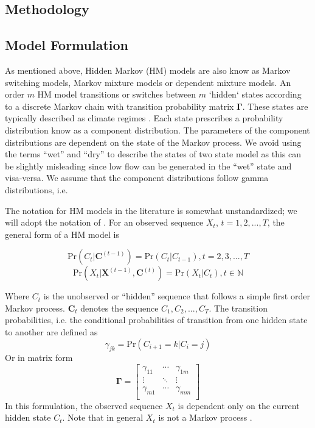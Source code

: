 \documentclass[wrr]{AGUTeX}
\begin{document}
\begin{article}
\section{Methodology}
\subsection{Model Formulation}
As mentioned above, Hidden Markov (HM) models are also know as Markov switching models, Markov mixture models or  dependent mixture models.  An order $m$ HM model transitions or switches between $m$ `hidden` states according to a discrete Markov chain with transition probability matrix $\boldsymbol\Gamma$.  These states are typically described as climate regimes \citep{Thyer:2000ud,Akntug:2005wx,Gelati:2010wk}.  Each state prescribes a probability distribution know as a component distribution.  The parameters of the component distributions are dependent on the state of the Markov process.  We avoid using the terms ``wet'' and ``dry'' to describe the states of two state model as this can be slightly misleading since low flow can be generated in the ``wet'' state and visa-versa.  We assume that the component distributions follow gamma distributions, i.e.

The notation for HM models in the literature is somewhat unstandardized; we will adopt the notation of \cite{Zucchini:2009vl}. For an observed sequence $X_t$, $t=1,2,...,T$,  the general form of a HM model is

\begin{equation}
\mbox{Pr}(C_t|\mathbf{C}^{(t-1)})=\mbox{Pr}(C_t|C_{t-1}), t=2,3,...,T
\end{equation}
\begin{equation}
\mbox{Pr}(X_t|\mathbf{X}^{(t-1)},\mathbf{C}^{(t)})=\mbox{Pr}(X_t|C_{t}), t\in\mathbb{N}
\end{equation}

Where $C_t$ is the unobserved or ``hidden'' sequence that follows a simple first order Markov process. $\mathbf{C}_t$ denotes the sequence $C_1, C_2, ..., C_T$.  The transition probabilities, i.e. the conditional probabilities of transition from one hidden state to another are defined as
\begin{equation}
\gamma_{jk} = \mbox{Pr}( C_{i+1} = k | C_i = j )
\end{equation}
Or in matrix form
\begin{equation}
\boldsymbol\Gamma = 
\left[
\begin{array}{ccc}
\gamma_{11} & \cdots & \gamma_{1m}\\
\vdots & \ddots & \vdots\\
\gamma_{m1} & \cdots & \gamma_{mm}\\
\end{array}
\right]
\end{equation}
In this formulation, the observed sequence $X_t$ is dependent only on the current hidden state $C_t$. Note that in general $X_t$ is not a Markov process \citep{Zucchini:2009vl}.  


\end{article}
\end{document}
